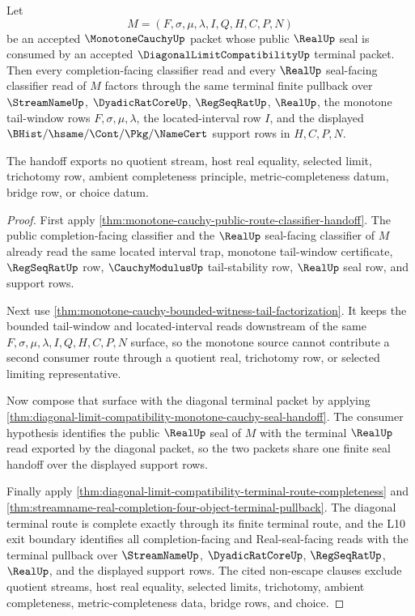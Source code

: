 \begin{theorem}
\label{thm:monotone-cauchy-diagonal-terminal-pullback-handoff}
Let
$$
M=(F,\sigma,\mu,\lambda,I,Q,H,C,P,N)
$$
be an accepted $\MonotoneCauchyUp$ packet whose public $\RealUp$ seal is
consumed by an accepted $\DiagonalLimitCompatibilityUp$ terminal packet. Then
every completion-facing classifier read and every $\RealUp$ seal-facing
classifier read of $M$ factors through the same terminal finite pullback over
$\StreamNameUp$, $\DyadicRatCoreUp$, $\RegSeqRatUp$, $\RealUp$, the monotone
tail-window rows $F,\sigma,\mu,\lambda$, the located-interval row $I$, and the
displayed $\BHist/\hsame/\Cont/\Pkg/\NameCert$ support rows in $H,C,P,N$.

The handoff exports no quotient stream, host real equality, selected limit,
trichotomy row, ambient completeness principle, metric-completeness datum,
bridge row, or choice datum.
\end{theorem}
\begin{proof}
First apply
\autoref{thm:monotone-cauchy-public-route-classifier-handoff}. The public
completion-facing classifier and the $\RealUp$ seal-facing classifier of $M$
already read the same located interval trap, monotone tail-window certificate,
$\RegSeqRatUp$ row, $\CauchyModulusUp$ tail-stability row, $\RealUp$ seal row,
and support rows.

Next use
\autoref{thm:monotone-cauchy-bounded-witness-tail-factorization}. It keeps the
bounded tail-window and located-interval reads downstream of the same
$F,\sigma,\mu,\lambda,I,Q,H,C,P,N$ surface, so the monotone source cannot
contribute a second consumer route through a quotient real, trichotomy row, or
selected limiting representative.

Now compose that surface with the diagonal terminal packet by applying
\autoref{thm:diagonal-limit-compatibility-monotone-cauchy-seal-handoff}. The
consumer hypothesis identifies the public $\RealUp$ seal of $M$ with the
terminal $\RealUp$ read exported by the diagonal packet, so the two packets
share one finite seal handoff over the displayed support rows.

Finally apply
\autoref{thm:diagonal-limit-compatibility-terminal-route-completeness} and
\autoref{thm:streamname-real-completion-four-object-terminal-pullback}. The
diagonal terminal route is complete exactly through its finite terminal route,
and the L10 exit boundary identifies all completion-facing and
Real-seal-facing reads with the terminal pullback over $\StreamNameUp$,
$\DyadicRatCoreUp$, $\RegSeqRatUp$, $\RealUp$, and the displayed support rows.
The cited non-escape clauses exclude quotient streams, host real equality,
selected limits, trichotomy, ambient completeness, metric-completeness data,
bridge rows, and choice.
\end{proof}

